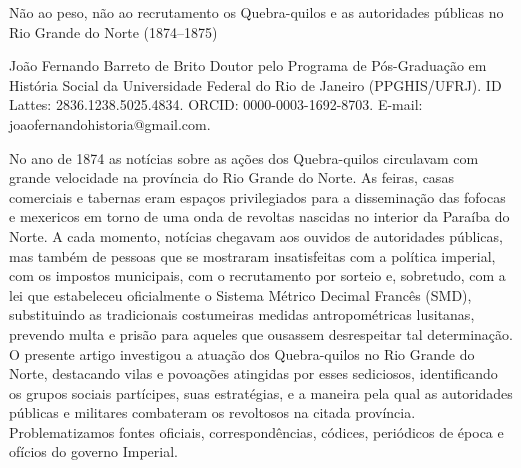 \begin{refsection}
\renewcommand{\thefigure}{\arabic{figure}}

\chapterTwoLines
{Não ao peso, não ao recrutamento}
{os Quebra-quilos e as autoridades públicas no Rio Grande do Norte (1874--1875)}
\label{chap:naoaopeso}

\articleAuthor
{João Fernando Barreto de Brito}
{Doutor pelo Programa de Pós-Graduação em História Social da Universidade Federal do Rio de Janeiro (PPGHIS/UFRJ). ID Lattes: 2836.1238.5025.4834. ORCID: 0000-0003-1692-8703. E-mail: joaofernandohistoria@gmail.com.}

\begin{galoResumo}
    No ano de 1874 as notícias sobre as ações dos Quebra-quilos circulavam com grande velocidade na província do Rio Grande do Norte. As feiras, casas comerciais e tabernas eram espaços privilegiados para a disseminação das fofocas e mexericos em torno de uma onda de revoltas nascidas no interior da Paraíba do Norte. A cada momento, notícias chegavam aos ouvidos de autoridades públicas, mas também de pessoas que se mostraram insatisfeitas com a política imperial, com os impostos municipais, com o recrutamento por sorteio e, sobretudo, com a lei que estabeleceu oficialmente o Sistema Métrico Decimal Francês (SMD), substituindo as tradicionais costumeiras medidas antropométricas lusitanas, prevendo multa e prisão para aqueles que ousassem desrespeitar tal determinação. O presente artigo investigou a atuação dos Quebra-quilos no Rio Grande do Norte, destacando vilas e povoações atingidas por esses sediciosos, identificando os grupos sociais partícipes, suas estratégias, e a maneira pela qual as autoridades públicas e militares combateram os revoltosos na citada província. Problematizamos fontes oficiais, correspondências, códices, periódicos de época e ofícios do governo Imperial. 
\end{galoResumo}


\begin{otherlanguage}{english}


\end{otherlanguage}
\end{refsection}
